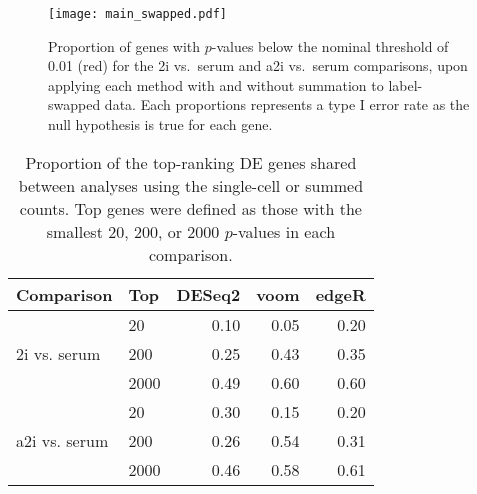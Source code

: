 \documentclass[oupdraft]{bio}
\begin{document}
\begin{figure}[!p]
\begin{center}
    \texttt{[image: main\_swapped.pdf]}
\end{center}
\caption{
    Proportion of genes with $p$-values below the nominal threshold of 0.01 (red) for the 2i vs.\ serum and a2i vs.\ serum comparisons, upon applying each method with and without summation to label-swapped data.
    Each proportions represents a type I error rate as the null hypothesis is true for each gene.
}
\label{fig:realswap}
\end{figure}

\begin{table}[!p]
\caption{Proportion of the top-ranking DE genes shared between analyses using the single-cell or summed counts.
Top genes were defined as those with the smallest 20, 200, or 2000 $p$-values in each comparison.
}
\label{tab:realrank}
\begin{center}
\begin{tabular}{l l r r r}
\hline
\textbf{Comparison} & \textbf{Top} & \textbf{DESeq2} & \textbf{voom} & \textbf{edgeR} \\
\hline
\multirow{3}{*}{2i vs. serum} 
& 20 & 0.10 & 0.05 & 0.20 \\
& 200 & 0.25 & 0.43 & 0.35 \\
& 2000 & 0.49 & 0.60 & 0.60 \\
\hline
\multirow{3}{*}{a2i vs. serum} 
& 20 & 0.30 & 0.15 & 0.20 \\
& 200 & 0.26 & 0.54 & 0.31 \\
& 2000 & 0.46 & 0.58 & 0.61 \\
\hline
\end{tabular}
\end{center}
\end{table}
\end{document}
